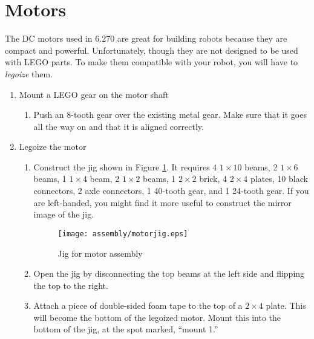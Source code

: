 \section{Motors}

The DC motors used in 6.270 are great for building robots because they
are compact and powerful. Unfortunately, though they are not designed
to be used with LEGO parts. To make them compatible with your robot,
you will have to {\it legoize} them.

\begin{enumerate}

\item Mount a LEGO gear on the motor shaft

\begin{enumerate}

 \item Push an 8-tooth gear over the existing metal gear. Make sure
 that it goes all the way on and that it is aligned correctly.

\end{enumerate}

\item Legoize the motor

\begin{enumerate}
 
 \item Construct the jig shown in Figure \ref{motorjig}. It requires 4
 $1\times10$ beams, 2 $1\times6$ beams, 1 $1\times4$ beam, 2 $1\times2$ beams, 1 $2\times2$
 brick, 4 $2\times4$ plates, 10 black connectors, 2 axle connectors, 1
 40-tooth gear, and 1 24-tooth gear. If you are left-handed, you might
 find it more useful to construct the mirror image of the jig.

\begin{figure}[htbp]
\begin{center}
\texttt{[image: assembly/motorjig.eps]}
\caption{Jig for motor assembly}
\label{motorjig}
\end{center}
\end{figure}

 \item Open the jig by disconnecting the top beams at the left side
 and flipping the top to the right.

 \item Attach a piece of double-sided foam tape to the top of a
 $2\times4$ plate. This will become the bottom of the legoized
 motor. Mount this into the bottom of the jig, at the spot marked,
 ``mount 1.''


\end{enumerate}
\end{enumerate}
